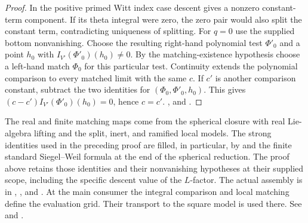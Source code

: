 \begin{proof}
In the positive primed Witt index case descent gives a nonzero constant-term component. If its theta integral were zero, the zero pair would also split the constant term, contradicting uniqueness of splitting. For \(q=0\) use the supplied bottom nonvanishing. Choose the resulting right-hand polynomial test \(\Phi'_0\) and a point \(h_0\) with \(I_{V'}(\Phi'_0)(h_0)\ne0\). By the matching-existence hypothesis choose a left-hand match \(\Phi_0\) for this particular test. Continuity extends the polynomial comparison to every matched limit with the same \(c\). If \(c'\) is another comparison constant, subtract the two identities for \((\Phi_0,\Phi'_0,h_0)\). This gives \((c-c')I_{V'}(\Phi'_0)(h_0)=0\), hence \(c=c'\). ,  and .
\end{proof}

The real and finite matching maps come from the spherical closure with real Lie-algebra lifting and the split, inert, and ramified local models. The strong identities used in the preceding proof are filled, in particular, by  and the finite standard Siegel--Weil formula at the end of the spherical reduction. The proof above retains those identities and their nonvanishing hypotheses at their supplied scope, including the specific descent value of the \(L\)-factor. The actual assembly is in , , and . At the main consumer the integral comparison and local matching define the evaluation grid. Their transport to the square model is used there. See  and .

